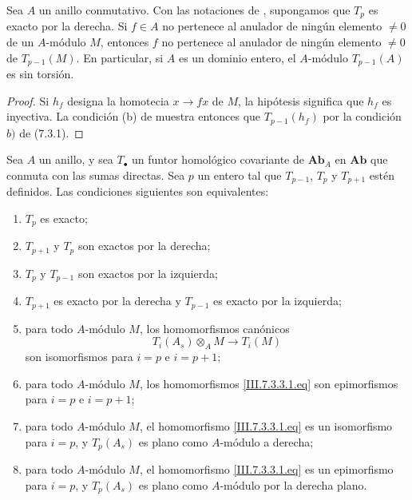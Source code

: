 \begin{corollary}[7.3.2]
\label{III.7.3.2}
Sea $A$ un anillo conmutativo. Con las notaciones de
, supongamos que $T_p$ es exacto por la derecha. Si
$f\in A$ no pertenece al anulador de ningún elemento
$\ne0$ de un $A$-módulo $M$, entonces $f$ no pertenece al anulador de ningún
elemento $\ne0$ de $T_{p-1}(M)$. En particular, si $A$ es un
dominio entero, el $A$-módulo $T_{p-1}(A)$ es sin torsión.
\end{corollary}

\begin{proof}
Si $h_f$ designa la homotecia $x\to fx$ de $M$, la hipótesis
significa que $h_f$ es inyectiva. La condición (b) de
 muestra entonces que $T_{p-1}(h_f)$ por
la condición $b)$ de (7.3.1).
\end{proof}

\begin{proposition}[7.3.3]
\label{III.7.3.3}
Sea $A$ un anillo, y sea $T_\bullet$ un funtor homológico
covariante de $\boldsymbol{Ab}_A$ en $\boldsymbol{Ab}$ que conmuta con las
sumas directas. Sea $p$ un entero tal que $T_{p-1}$, $T_p$ y
$T_{p+1}$ estén definidos. Las condiciones siguientes son
equivalentes:
\begin{enumerate}
  \item[(a)] $T_p$ es exacto;
  \item[(b)] $T_{p+1}$ y $T_p$ son exactos por la derecha;
  \item[(c)] $T_p$ y $T_{p-1}$ son exactos por la izquierda;
  \item[(d)] $T_{p+1}$ es exacto por la derecha y $T_{p-1}$ es
    exacto por la izquierda;
  \item[(e)] para todo $A$-módulo $M$, los homomorfismos canónicos
    \[
      T_i(A_s)\otimes_A M\longrightarrow T_i(M)
      \tag{7.3.3.1}\label{III.7.3.3.1.fr}
    \]
    son isomorfismos para $i=p$ e $i=p+1$;
  \item[($e'$)] para todo $A$-módulo $M$, los
    homomorfismos \eqref{III.7.3.3.1.eq} son epimorfismos para
    $i=p$ e $i=p+1$;
  \item[(f)] para todo $A$-módulo $M$, el homomorfismo
    \eqref{III.7.3.3.1.eq} es un isomorfismo para $i=p$, y
    $T_p(A_s)$ es plano como $A$-módulo a derecha;
  \item[($f'$)] para todo $A$-módulo $M$, el
    homomorfismo \eqref{III.7.3.3.1.eq} es un epimorfismo para
    $i=p$, y $T_p(A_s)$ es plano como $A$-módulo por la derecha plano.
\end{enumerate}
\end{proposition}

